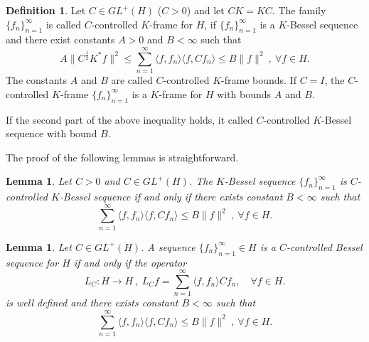 \documentclass[11pt]{amsart}
\newtheorem{lem}[thm]{Lemma}
\theoremstyle{definition}
\newtheorem{defn}[thm]{Definition}
\theoremstyle{remark}
\numberwithin{equation}{section}
\begin{document}
\begin{defn}
Let $C\in GL^+(H)$ ($C>0$) and let $CK=KC$. The family $\{f_n\}_{n=1}^\infty$ is called  $C$-controlled $K$-frame for $H$, if $\{f_n\}_{n=1}^\infty$ is a $K$-Bessel sequence and there exist constants $A>0$ and $B<\infty$ such that
\[A\|C^{\frac{1}{2}}K^*f\|^2\le\sum_{n=1}^{\infty}\langle f,f_n\rangle\langle f,Cf_n\rangle\le B\|f\|^2\ ,~\forall f\in H.\]
The constants $A$ and $B$ are called $C$-controlled $K$-frame bounds. If $C=I$, the $C$-controlled $K$-frame  $\{f_n\}_{n=1}^\infty$ is a $K$-frame for $H$ with bounds $A$ and $B$.

If the second part of the above inequality holds, it  called  $C$-controlled $K$-Bessel sequence with bound $B$.
\end{defn}

The proof of the following lemmas is straightforward.

\begin{lem}
Let $C>0$ and  $C\in GL^+(H)$. The $K$-Bessel sequence $\{f_n\}_{n=1}^\infty$ is $C$-controlled $K$-Bessel sequence if and only if there exists constant $B<\infty$ such that
\[\sum_{n=1}^{\infty}\langle f,f_n\rangle\langle f,Cf_n\rangle\le B\|f\|^2\ ,~\forall f\in H.\]
\end{lem}

\begin{lem}
Let $C\in GL^+(H)$. A sequence $\{f_n\}_{n=1}^\infty\in H$ is a $C$-controlled Bessel sequence for $H$ if and only if the operator
\[L_C:H\to H\ ,~L_Cf=\sum_{n=1}^{\infty}\langle f,f_n\rangle Cf_n,\quad \forall f\in H.\]
is well defined and there exists constant $B<\infty$ such that
\[\sum_{n=1}^{\infty}\langle f,f_n\rangle\langle f,Cf_n\rangle\le B\|f\|^2\ ,~\forall f\in H.\]
\end{lem}
\end{document}

